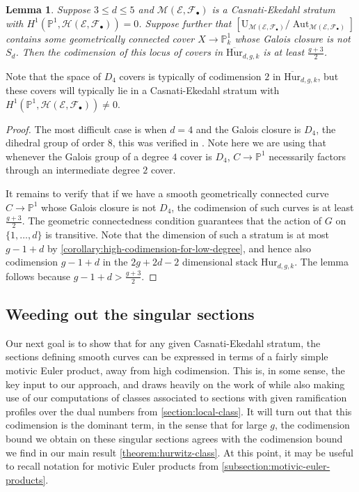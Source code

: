 \documentclass[12 pt]{amsart}
\theoremstyle{plain}
\newtheorem{lemma}[theorem]{Lemma}
\theoremstyle{definition}
\theoremstyle{remark}
\numberwithin{equation}{section}
\newcommand\bp{\mathbb P}
\newcommand\sce{\mathscr E}
\newcommand\scf{\mathscr F}
\newcommand\sch{\mathscr H}
\newcommand\bighurg[3]{\overline{\mathrm{Hur}}_{#1,#2, #3}} %
\newcommand\hur[3]{\mathrm{Hur}_{#1,#2,#3}} %
\newcommand\ce{\mathscr M} %
\newcommand\ramlocus[2]{\mathrm{U}_{#1}^{#2}} %
\DeclareMathOperator\aut{Aut}
\begin{document}
\begin{lemma} \label{lemma:bounding-non-Sd-covers} Suppose $3 \leq d \leq 5$ and
	$\ce(\sce,\scf_\bullet)$ is a Casnati-Ekedahl stratum with $H^1(\bp^1,
	\sch(\sce, \scf_\bullet)) = 0$. 
	Suppose further that $[\ramlocus {\ce(\sce,
	\scf_\bullet)}{}/\aut_{\ce(\sce, \scf_\bullet)}]$ contains some
	geometrically connected cover $X
	\to \bp^1_k$ whose Galois closure is not $S_d$.
	Then the codimension of this locus of covers in $\bighurg d g k$ is at
	least $\frac{g+3}{2}$.
\end{lemma} 
Note that the space of $D_4$ covers is typically of codimension $2$ in 
$\bighurg d g k$, but these covers will typically lie in a Casnati-Ekedahl
stratum with 
$H^1(\bp^1,\sch(\sce, \scf_\bullet)) \neq 0$. 
\begin{proof}
	The most difficult case is when $d = 4$ and the Galois closure is $D_4$, the dihedral
	group of order $8$, this was verified in 
	\cite[Lem.\
	5.5]{canningL:tautological-classes-on-low-degree-hurwitz-spaces}.
	Note here we are using that whenever the Galois group of a
	degree $4$ cover is $D_4$, $C\to \bp^1$ necessarily factors through an
	intermediate degree $2$ cover.  
	
	It remains to verify that if we have a
	smooth geometrically connected curve $C \to \bp^1$ whose Galois closure
	is not $D_4$, the codimension of such curves is at least
	$\frac{g + 3}{2}$.
	The geometric connectedness condition guarantees that the action of $G$
	on $\{1, \ldots, d\}$ is transitive.
	Note that the dimension of such a stratum is at most $g - 1 + d$ by
\autoref{corollary:high-codimension-for-low-degree}, and hence also
	codimension $g - 1 + d$ in the $2g+2d-2$ dimensional stack $\hur d g k$.  
	The lemma follows because $g - 1 + d > \frac{g + 3}{2}$.  \end{proof} 

\subsection{Weeding out the singular sections}
\label{subsection:codimension-singular-sections}

Our next goal is to show that for any given Casnati-Ekedahl stratum,
the sections defining smooth curves can be expressed in terms of a fairly simple motivic Euler
product, away from high codimension.
This is, in some sense, the key input to our approach, and draws heavily on the
work of \cite{biluH:motivic-euler-products-in-motivic-statistics} while
also making use of our computations of classes associated to sections with given
ramification profiles over the dual numbers from \autoref{section:local-class}.
It will turn out that this codimension is the dominant term, in the sense that
for large $g$, the codimension bound we obtain on these singular sections agrees
with the codimension bound we find in our main result
\autoref{theorem:hurwitz-class}.
At this point, it may be useful to recall notation for motivic Euler products
from \autoref{subsection:motivic-euler-products}.
\end{document}
